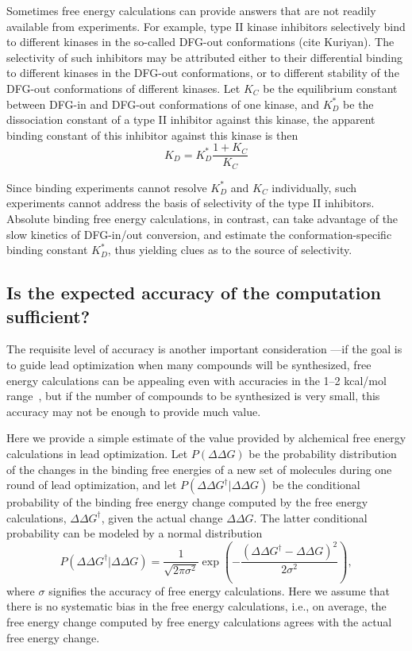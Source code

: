 \documentclass[9pt,bestpractices]{livecoms}
\begin{document}
Sometimes free energy calculations can provide answers that are not
readily available from experiments.  For example, type II kinase
inhibitors selectively bind to different kinases in the so-called
DFG-out conformations (cite Kuriyan).  The selectivity of such
inhibitors may be attributed either to their differential binding to
different kinases in the DFG-out conformations, or to different
stability of the DFG-out conformations of different kinases.  Let
$K_C$ be the equilibrium constant between DFG-in and DFG-out
conformations of one kinase, and $K_D^\ast$ be the dissociation
constant of a type II inhibitor against this kinase, the apparent
binding constant of this inhibitor against this kinase is then
\begin{equation}
  K_D = K_D^\ast \frac{1 + K_C}{K_C}
  \label{eqn:conformational-binding}
\end{equation}

Since binding experiments cannot resolve $K_D^\ast$ and $K_C$ individually, such experiments cannot address the basis of selectivity of the type II inhibitors.  Absolute binding free energy calculations, in contrast, can take advantage of the slow kinetics of DFG-in/out conversion, and estimate the conformation-specific binding constant $K_D^\ast$, thus yielding clues as to the source of selectivity.

\subsection{Is the expected accuracy of the computation sufficient?}
\label{subsec:accuracy}
The requisite level of accuracy is another important consideration ---if the
goal is to guide lead optimization when many compounds will be
synthesized, free energy calculations can be appealing even with
accuracies in the 1--2 kcal/mol range~\cite{mobley2012perspective}, but if the number of compounds to be synthesized is very small, this accuracy may not be enough to provide much value.

Here we provide a simple estimate of the value provided by alchemical
free energy calculations in lead optimization.  Let $P(\Delta\Delta
G)$ be the probability distribution of the changes in the binding free
energies of a new set of molecules during one round of lead
optimization, and let $P(\Delta\Delta G^\dagger|\Delta\Delta G)$ be the
conditional probability of the binding free energy change computed by
the free energy calculations, $\Delta\Delta G^\dagger$, given the actual
change $\Delta\Delta G$.  The latter conditional probability can be modeled
by a normal distribution
\begin{equation}
  P(\Delta\Delta G^\dagger|\Delta\Delta G) = \frac{1}{\sqrt{2\pi\sigma^2}}
  \exp\left(-\frac{(\Delta\Delta G^\dagger - \Delta\Delta G)^2}{2\sigma^2}\right),
  \label{eqn:free-energy-distribution}
\end{equation}
where $\sigma$ signifies the accuracy of free energy calculations.
Here we assume that there is no systematic bias in the free energy
calculations, i.e., on average, the free energy change computed by
free energy calculations agrees with the actual free energy change.
\end{document}
